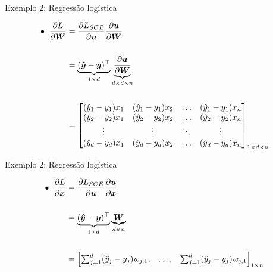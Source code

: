 \documentclass[10pt]{beamer}
\begin{document}
\begin{frame}{Exemplo 2: Regressão logística}
\large{

\begin{align*}
\bullet \; \; \frac{\partial L}{\partial \bm{W}}&= \frac{\partial L_{SCE}}{\partial \bm{u}}\frac{\partial \bm{u}}{\partial \bm{W}}\\
&\\
&= \underbrace{(\bm{\hat{y}} - \bm{y})^{\top}}_{\tiny{1 \times d}}\underbrace{\frac{\partial \bm{u}}{\partial \bm{W}}}_{\tiny{d \times d \times n}}\\
&\\
&= \begin{bmatrix} (\hat{y}_1 - y_1)x_1 & (\hat{y}_1 - y_1)x_2 & \dots & (\hat{y}_1 - y_1)x_n\\
(\hat{y}_2 - y_2)x_1 & (\hat{y}_2 - y_2)x_2 & \dots & (\hat{y}_2 - y_2)x_n\\
\vdots & \vdots & \ddots & \vdots\\ 
(\hat{y}_d - y_d)x_1 & (\hat{y}_d - y_d)x_2 & \dots & (\hat{y}_d - y_d)x_n\\\end{bmatrix}_{\tiny{1 \times d \times n}}\\
\end{align*}
}
\end{frame}


\begin{frame}{Exemplo 2: Regressão logística}
\Large{

\begin{align*}
\bullet \; \; \frac{\partial L}{\partial \bm{x}}&= \frac{\partial L_{SCE}}{\partial \bm{u}}\frac{\partial \bm{u}}{\partial \bm{x}}\\
&\\
&= \underbrace{(\bm{\hat{y}} - \bm{y})^{\top}}_{\tiny{1 \times d}}\underbrace{\bm{W}}_{\tiny{d \times n}}\\
&\\
&= \begin{bmatrix} \sum_{j=1}^{d} (\hat{y}_j - y_j)w_{j,1}, & \dots , & \sum_{j=1}^{d} (\hat{y}_j - y_j)w_{j,1}\\\end{bmatrix}_{\tiny{1 \times n}}\\
\end{align*}
}
\end{frame}
\end{document}
